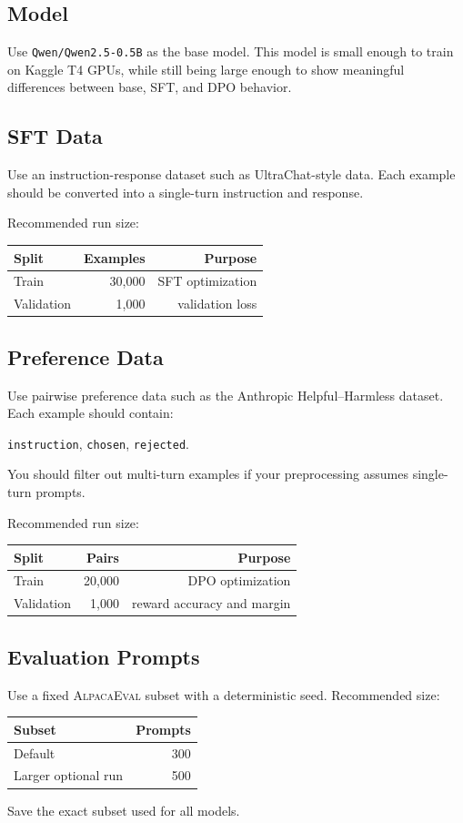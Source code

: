 \documentclass[11pt]{article}
\newcommand{\modelname}{\texttt{Qwen/Qwen2.5-0.5B}}
\newcommand{\alpaca}{\textsc{AlpacaEval}}
\newcommand{\hh}{Anthropic Helpful--Harmless}
\begin{document}
\subsection{Model}
Use \modelname{} as the base model. This model is small enough to train on Kaggle T4 GPUs, while still being large enough to show meaningful differences between base, SFT, and DPO behavior.

\subsection{SFT Data}
Use an instruction-response dataset such as UltraChat-style data. Each example should be converted into a single-turn instruction and response.

Recommended run size:
\begin{center}
\begin{tabular}{lrr}
\toprule
Split & Examples & Purpose \\
\midrule
Train & 30,000 & SFT optimization \\
Validation & 1,000 & validation loss \\
\bottomrule
\end{tabular}
\end{center}

\subsection{Preference Data}
Use pairwise preference data such as the \hh{} dataset. Each example should contain:
\begin{center}
\texttt{instruction}, \texttt{chosen}, \texttt{rejected}.
\end{center}
You should filter out multi-turn examples if your preprocessing assumes single-turn prompts.

Recommended run size:
\begin{center}
\begin{tabular}{lrr}
\toprule
Split & Pairs & Purpose \\
\midrule
Train & 20,000 & DPO optimization \\
Validation & 1,000 & reward accuracy and margin \\
\bottomrule
\end{tabular}
\end{center}

\subsection{Evaluation Prompts}
Use a fixed \alpaca{} subset with a deterministic seed. Recommended size:
\begin{center}
\begin{tabular}{lr}
\toprule
Subset & Prompts \\
\midrule
Default & 300 \\
Larger optional run & 500 \\
\bottomrule
\end{tabular}
\end{center}
Save the exact subset used for all models.
\end{document}
